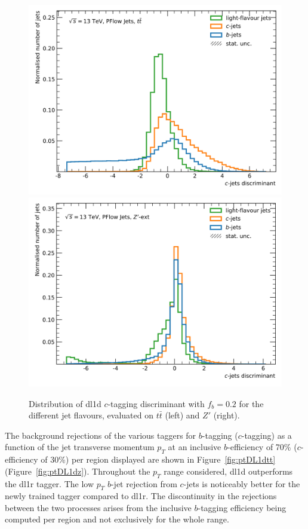 \begin{center}
\begin{figure}[h!]
{  \includegraphics[scale=0.5]{Images/FTAG/DL1d/ROC/scores_DL1_ttbar_c_299.png}
  \includegraphics[scale=0.5]{Images/FTAG/DL1d/ROC/scores_DL1_zp_c_299.png}
  }
  \caption{Distribution of \gls{dl1d} $c$-tagging discriminant with $f_b = 0.2$ for the different jet flavours, evaluated on $t\bar{t}$ (left) and $Z'$ (right).}
  \label{fig:scoreDL1dz}
  \end{figure}
\end{center}

The background rejections of the various taggers for $b$-tagging ($c$-tagging) as a function of the jet transverse momentum $p_T$ at an inclusive $b$-efficiency of 70\% ($c$-efficiency of 30\%) per region displayed are shown in Figure~\ref{fig:ptDL1dtt} (Figure~\ref{fig:ptDL1dz}). Throughout the $p_T$ range considered, \gls{dl1d} outperforms the \gls{dl1r} tagger. The low $p_T$ $b$-jet rejection from $c$-jets is noticeably better for the newly trained tagger compared to \gls{dl1r}. The discontinuity in the rejections between the two processes arises from the inclusive $b$-tagging efficiency being computed per region and not exclusively for the whole range.

